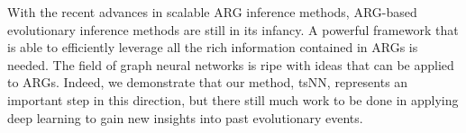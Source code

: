 With the recent advances in scalable ARG inference methods, 
ARG-based evolutionary inference methods are still in its infancy.
A powerful framework that is able to efficiently leverage all the rich information contained in ARGs is needed.
The field of graph neural networks is ripe with ideas that can be applied to ARGs.
Indeed, we demonstrate that our method, tsNN, represents an important step in this direction,
but there still much work to be done in applying deep learning to gain new insights into past evolutionary events.
